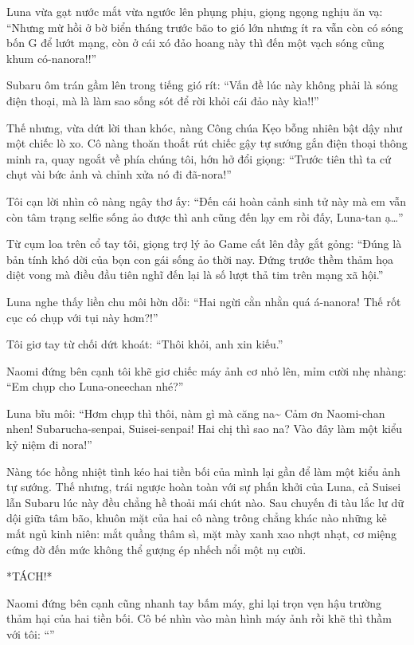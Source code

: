 \documentclass[../main.tex]{subfiles}
\begin{document}
Luna vừa gạt nước mắt vừa ngước lên phụng phịu, giọng ngọng nghịu ăn vạ: ``Nhưng mừ hồi ở bờ biển tháng trước bão to gió lớn nhưng ít ra vẫn còn có sóng bốn G để lướt mạng, còn ở cái xó đảo hoang này thì đến một vạch sóng cũng khum có-nanora!!''

Subaru ôm trán gầm lên trong tiếng gió rít: ``Vấn đề lúc này không phải là sóng điện thoại, mà là làm sao sống sót để rời khỏi cái đảo này kìa!!''

Thế nhưng, vừa dứt lời than khóc, nàng Công chúa Kẹo bỗng nhiên bật dậy như một chiếc lò xo. Cô nàng thoăn thoắt rút chiếc gậy tự sướng gắn điện thoại thông minh ra, quay ngoắt về phía chúng tôi, hớn hở đổi giọng: ``Trước tiên thì ta cứ chụt vài bức ảnh và chỉnh xửa nó đi đã-nora!''


Tôi cạn lời nhìn cô nàng ngây thơ ấy: ``Đến cái hoàn cảnh sinh tử này mà em vẫn còn tâm trạng selfie sống ảo được thì anh cũng đến lạy em rồi đấy, Luna-tan ạ\dots''

Từ cụm loa trên cổ tay tôi, giọng trợ lý ảo Game cất lên đầy gắt gỏng: ``Đúng là bản tính khó dời của bọn con gái sống ảo thời nay. Đứng trước thềm thảm họa diệt vong mà điều đầu tiên nghĩ đến lại là số lượt thả tim trên mạng xã hội.''

Luna nghe thấy liền chu môi hờn dỗi: ``Hai ngừi cằn nhằn quá á-nanora! Thế rốt cục có chụp với tụi này hơm?!''

Tôi giơ tay từ chối dứt khoát: ``Thôi khỏi, anh xin kiếu.''

Naomi đứng bên cạnh tôi khẽ giơ chiếc máy ảnh cơ nhỏ lên, mỉm cười nhẹ nhàng: ``Em chụp cho Luna-oneechan nhé?''

Luna bĩu môi: ``Hơm chụp thì thôi, nàm gì mà căng na\~{} Cảm ơn Naomi-chan nhen! Subarucha-senpai, Suisei-senpai! Hai chị thì sao na? Vào đây làm một kiểu kỷ niệm đi nora!''

Nàng tóc hồng nhiệt tình kéo hai tiền bối của mình lại gần để làm một kiểu ảnh tự sướng. Thế nhưng, trái ngược hoàn toàn với sự phấn khởi của Luna, cả Suisei lẫn Subaru lúc này đều chẳng hề thoải mái chút nào. Sau chuyến đi tàu lắc lư dữ dội giữa tâm bão, khuôn mặt của hai cô nàng trông chẳng khác nào những kẻ mất ngủ kinh niên: mắt quầng thâm sì, mặt mày xanh xao nhợt nhạt, cơ miệng cứng đờ đến mức không thể gượng ép nhếch nổi một nụ cười.


*TÁCH!*

Naomi đứng bên cạnh cũng nhanh tay bấm máy, ghi lại trọn vẹn hậu trường thảm hại của hai tiền bối. Cô bé nhìn vào màn hình máy ảnh rồi khẽ thì thầm với tôi: ``''
\end{document}
